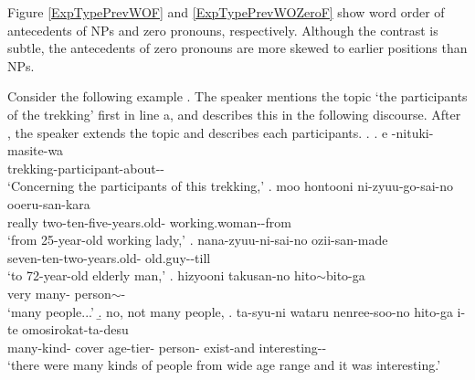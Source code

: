 Figure \ref{ExpTypePrevWOF} and \ref{ExpTypePrevWOZeroF} show word order of antecedents of NPs and zero pronouns, respectively.
Although the contrast is subtle,
the antecedents of zero pronouns are more skewed to earlier positions than NPs.

Consider the following example \Next.
The speaker mentions the topic `the participants of the trekking' first in line a,
and describes this in the following discourse.
After \Next[f],
the speaker extends the topic and describes each participants.
%
\ex.\label{trekking}
 \ag. e -nituki-masite-wa \\
 	 trekking-participant-about-- \\
	`Concerning the participants of this trekking,'
 \bg. moo hontooni ni-zyuu-go-sai-no ooeru-san-kara \\
 	 really two-ten-five-years.old- working.woman--from \\
	`from 25-year-old working lady,'
 \bg. nana-zyuu-ni-sai-no ozii-san-made \\
 	seven-ten-two-years.old- old.guy--till \\
	`to 72-year-old elderly man,'
 \bg. hizyooni takusan-no hito$\sim$bito-ga \\
 	very many- person$\sim$- \\
	`many people...'
 \b. no, not many people,
 \bg. ta-syu-ni wataru nenree-soo-no hito-ga i-te omosirokat-ta-desu \\
 		many-kind- cover age-tier- person- exist-and interesting-- \\
		`there were many kinds of people from wide age range and it was interesting.'

